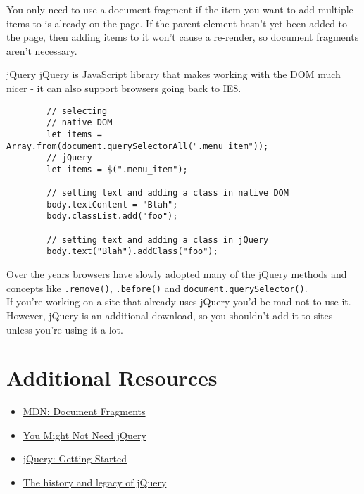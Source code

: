 You only need to use a document fragment if the item you want to add multiple items to is already on the page. If the parent element hasn't yet been added to the page, then adding items to it won't cause a re-render, so document fragments aren't necessary.

\pagebreak

\begin{infobox}{jQuery}
    jQuery is JavaScript library that makes working with the DOM much nicer - it can also support browsers going back to IE8.

    \begin{verbatim}
        // selecting
        // native DOM
        let items = Array.from(document.querySelectorAll(".menu_item"));
        // jQuery
        let items = $(".menu_item");

        // setting text and adding a class in native DOM
        body.textContent = "Blah";
        body.classList.add("foo");

        // setting text and adding a class in jQuery
        body.text("Blah").addClass("foo");
    \end{verbatim}

    Over the years browsers have slowly adopted many of the jQuery methods and concepts like \texttt{.remove()}, \texttt{.before()} and \texttt{document.querySelector()}.
    \\

    If you're working on a site that already uses jQuery you'd be mad not to use it. However, jQuery is an additional download, so you shouldn't add it to sites unless you're using it a lot.
\end{infobox}



\section{Additional Resources}

\begin{itemize}[leftmargin=*]
    \item \href{https://developer.mozilla.org/en-US/docs/Web/API/Document/createDocumentFragment}{MDN: Document Fragments}
    \item \href{https://css-tricks.com/now-ever-might-not-need-jquery/}{You Might Not Need jQuery}
    \item \href{https://www.elated.com/articles/jquery-getting-started/}{jQuery: Getting Started}
    \item \href{https://blog.logrocket.com/the-history-and-legacy-of-jquery/}{The history and legacy of jQuery}
\end{itemize}
